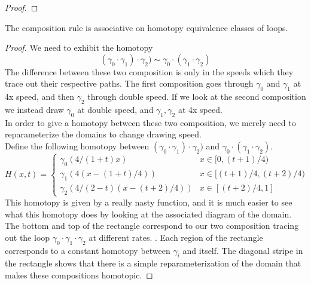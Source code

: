 \begin{doubledtuftepage}
\begin{proof}
\end{proof}

\begin{claim}
	The composition rule is associative on homotopy equivalence classes of loops.
\end{claim}
\begin{proof}
	We need to exhibit the homotopy \[(\gamma_0\cdot \gamma_1)\cdot \gamma_2)\sim\gamma_0\cdot (\gamma_1\cdot \gamma_2)\] The difference between these two composition is only in the speeds which they trace out their respective paths.  The first composition goes through $\gamma_0$ and $\gamma_1$ at 4x speed,  and then $\gamma_2$ through double speed.   
	If we look at the second composition we instead draw $\gamma_0$ at double speed,  and $\gamma_1,  \gamma_2$ at 4x speed. \\
	In order to give a homotopy between these two composition, we merely need to reparameterize the domains to change drawing speed.\\
  Define the following homotopy between $(\gamma_0\cdot \gamma_1)\cdot \gamma_2)$ and $\gamma_0\cdot (\gamma_1\cdot \gamma_2)$. 
  \[H(x,  t)=\left\{\begin{array}{cc} 
                    	\gamma_0(4/(1+t) x) & x\in [0, (t+1)/4)\\
                    	\gamma_1(4(x-(1+t)/4))& x\in [(t+1)/4,  (t+2)/4)\\
                    	\gamma_2(4/(2-t)( x- (t+2)/4))& x\in [(t+2)/4,  1]
                    \end{array}\right.\]
	This homotopy is given by a really nasty function, and it is much easier 
	to see what this homotopy does by looking at the associated diagram of the domain. The bottom and top of the rectangle correspond to our two composition tracing out the loop $\gamma_0\cdot \gamma_1\cdot \gamma_2$ at different rates. . Each region of the rectangle corresponds to a constant homotopy between $\gamma_i$ and itself.  The diagonal stripe in the rectangle shows that there is a simple reparameterization of the domain that makes these compositions homotopic.
\end{proof}

\end{doubledtuftepage}
